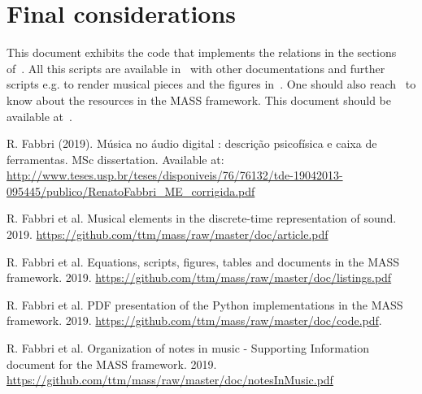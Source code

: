 \documentclass{article}
\begin{document}
\section{Final considerations}
This document exhibits the code that implements the relations
in the sections of~\cite{massArticle}.
All this scripts are available in~\cite{massRepo} with
other documentations and further scripts e.g. to render musical
pieces and the figures in~\cite{massArticle}.
One should also reach~\cite{massListings} to know
about the resources in the MASS framework.
This document should be available at~\cite{massCode}.

\begin{thebibliography}{9}
    R. Fabbri (2019). M\'usica no \'audio digital : descri\c{c}\~ao psicof\'isica e caixa de ferramentas. MSc dissertation. Available at: \url{http://www.teses.usp.br/teses/disponiveis/76/76132/tde-19042013-095445/publico/RenatoFabbri_ME_corrigida.pdf}

  R. Fabbri et al.
  Musical elements in the discrete-time representation of sound. 2019.
    \url{https://github.com/ttm/mass/raw/master/doc/article.pdf}

  R. Fabbri et al.
  Equations, scripts, figures, tables and documents in the MASS framework. 2019.
    \url{https://github.com/ttm/mass/raw/master/doc/listings.pdf}

  R. Fabbri et al.
  PDF presentation of the Python implementations in the MASS framework. 2019.
    \url{https://github.com/ttm/mass/raw/master/doc/code.pdf}.

  R. Fabbri et al.
  Organization of notes in music - Supporting Information document for the MASS framework. 2019.
    \url{https://github.com/ttm/mass/raw/master/doc/notesInMusic.pdf}
\end{thebibliography}
\end{document}

